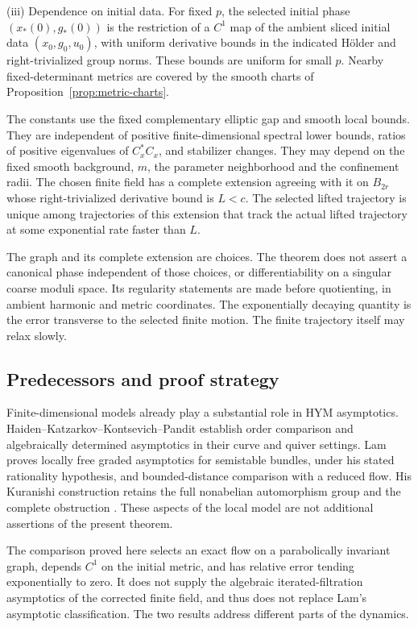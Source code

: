 \begin{theorem}
\smallskip\noindent
\textup{(iii) Dependence on initial data.} For fixed $p$, the selected initial phase
$(x_*(0),g_*(0))$ is the restriction of a $C^1$ map of the ambient
sliced initial data $(x_0,g_0,u_0)$, with uniform derivative bounds in
the indicated H\"older and right-trivialized group norms. These bounds
are uniform for small $p$. Nearby fixed-determinant metrics are covered
by the smooth charts of Proposition~\ref{prop:metric-charts}.

\smallskip\noindent
The constants use the fixed complementary elliptic gap and smooth
local bounds. They are independent of positive finite-dimensional spectral lower
bounds, ratios of positive eigenvalues of $C_x^*C_x$, and stabilizer
changes. They may depend on the fixed smooth background, $m$, the
parameter neighborhood and the confinement radii. The chosen finite
field has a complete extension agreeing with it on $B_{2r}$ whose
right-trivialized derivative bound is $L<c$. The selected lifted
trajectory is unique among trajectories of this extension that track
the actual lifted trajectory at some exponential rate faster than $L$.
\end{theorem}

The graph and its complete extension are choices. The theorem does not
assert a canonical phase independent of those choices, or differentiability
on a singular coarse moduli space. Its regularity statements are made
before quotienting, in ambient harmonic and metric coordinates.
The exponentially decaying quantity is the error transverse to the
selected finite motion. The finite trajectory itself may relax slowly.

\subsection{Predecessors and proof strategy}
Finite-dimensional models already play a substantial role in HYM
asymptotics. Haiden--Katzarkov--Kontsevich--Pandit
\cite{hkkp2018,hkkp2023} establish order comparison and algebraically
determined asymptotics in their curve and quiver settings. Lam
\cite[Theorem~8.2 and Proposition~8.6]{lam}
proves locally free graded asymptotics for semistable bundles,
under his stated rationality hypothesis, and bounded-distance
comparison with a reduced flow. His Kuranishi
construction retains the full nonabelian automorphism group and the
complete obstruction \cite[Theorem~8.7]{lam}. These aspects of the local
model are not additional assertions of the present theorem.

The comparison proved here selects an exact flow on a parabolically
invariant graph, depends $C^1$ on the initial metric, and has relative
error tending exponentially to zero. It does not supply the algebraic
iterated-filtration asymptotics of the corrected finite field, and thus
does not replace Lam's asymptotic classification. The two results
address different parts of the dynamics.

